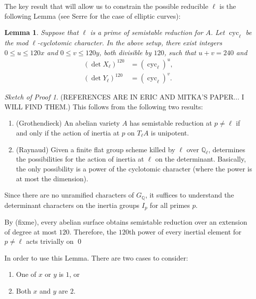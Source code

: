 \documentclass[11pt]{amsart}
\newcommand{\qq}{\mathbb{Q}}
\newcommand{\cyc}{\operatorname{cyc}}
\newtheorem{lem}[thm]{Lemma}
\theoremstyle{definition}
\theoremstyle{remark}
\newtheorem*{skproof}{Sketch of Proof}
\begin{document}
The key result that will allow us to constrain the possible reducible $\ell$ is the following Lemma (see Serre for the case of elliptic curves):

\begin{lem}
Suppose that $\ell$ is a prime of semistable reduction for $A$.  Let $\cyc_\ell$ be the mod $\ell$-cyclotomic character.
In the above setup, there exist integers $0 \leq u \leq 120x$ and $0 \leq v \leq 120 y$, both divisible by $120$, such that $u + v = 240$ and
\begin{align*}
\left( \det X_{\ell} \right)^{120} &= \left(\cyc_\ell\right)^u, \\
\left( \det Y_{\ell} \right)^{120} &= \left(\cyc_\ell\right)^v.
\end{align*}
\end{lem}
\begin{skproof}
(REFERENCES ARE IN ERIC AND MITKA'S PAPER... I WILL FIND THEM.) This follows from the following two results:
\begin{enumerate}
\item (Grothendieck) An abelian variety $A$ has semistable reduction at $p \neq \ell$ if and only if the action of inertia at $p$ on $T_\ell A$ is unipotent.
\item (Raynaud) Given a finite flat group scheme killed by $\ell$ over $\qq_\ell$, determines the possibilities for the action of inertia at $\ell$ on the determinant.  Basically, the only possibility is a power of the cyclotomic character (where the power is at most the dimension).
\end{enumerate}
Since there are no unramified characters of $G_\qq$, it suffices to understand the determinant characters on the inertia groups $I_p$ for all primes $p$.

By (fixme), every abelian surface obtains semistable reduction over an extension of degree at most $120$.  Therefore, the $120$th power of every inertial element for $p\neq \ell$ acts trivially on 
\qed
\end{skproof}

In order to use this Lemma.  There are two cases to consider:
\begin{enumerate}
\item\label{odd} One of $x$ or $y$ is $1$, or
\item\label{even} Both $x$ and $y$ are $2$.
\end{enumerate}
\end{document}
